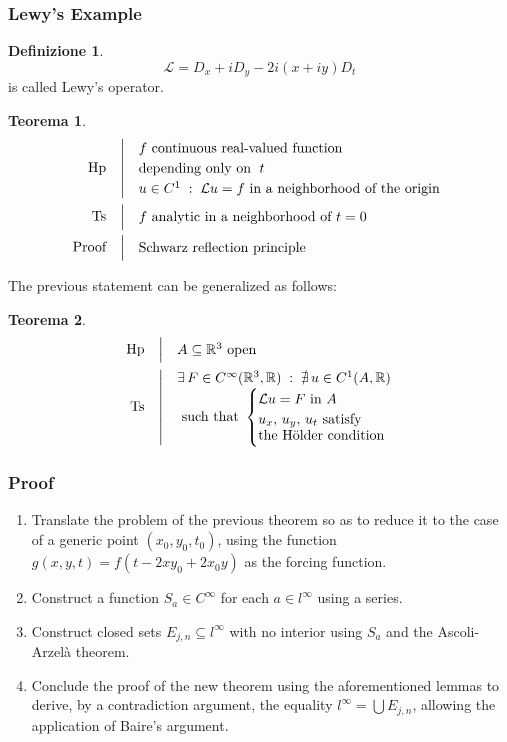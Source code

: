 \documentclass[serif,notheorems]{beamer}
\makeatletter
\newenvironment{ipotesi}%
{\quad\left|\quad\def\arraystretch{1.2}\begin{array}{@{}l@{}}}%
{\end{array}\right.}
\newcommand{\hpth}[2]
{
\begin{align*}
\quad
\text{Hp}
&\begin{ipotesi}
#1
\end{ipotesi}\\
\text{Ts}
&\begin{ipotesi}
#2
\end{ipotesi}
\end{align*}
}
\newcommand{\hpthdim}[3]
{
\begin{align*}
\quad
\text{Hp}
&\begin{ipotesi} 
#1
\end{ipotesi}\\
\text{Ts}
&\begin{ipotesi}
#2
\end{ipotesi}\\
\text{Proof}
&\begin{ipotesi}
#3
\end{ipotesi}
\end{align*}
}
\theoremstyle{definition} %
\newtheorem{theorem}{Teorema}[section] %
\newtheorem{definition}{Definizione}[section] %
\theoremstyle{remark}
\makeatother
\begin{document}
\begin{frame}
\frametitle{Lewy's Example}
\begin{definition}
$$\mathcal{L}=D_x+iD_y-2i(x+iy)D_t$$
is called Lewy's operator.
\end{definition}
\end{frame}

\begin{frame}
\begin{theorem}
\hpthdim{
f \text{ continuous real-valued function}\\ 
\text{depending only on } \; t\\
u\in C^1\;:\;\mathcal{L}u=f \text{ in a neighborhood of the origin }
}
{f \text{ analytic in a neighborhood of } t=0}{
\text{Schwarz reflection principle}
}
\end{theorem}
\end{frame}

\begin{frame}
The previous statement can be generalized as follows:
\begin{theorem}
\hpth{
A \subseteq \mathbb{R}^3 \text{ open }\\
}
{
\exists \, F \in C^{\infty}(\mathbb{R}^3,\mathbb{R}) \; : \; \nexists \, u \in C^1(A,\mathbb{R}) \\ \text{ such that }
\begin{cases}
\mathcal{L}u=F \text{ in } A\\
\vspace{-1mm}
u_x,\,u_y,\,u_t \text{ satisfy} \\
\text {the Hölder condition }
\end{cases}
}
\end{theorem}
\end{frame}

\begin{frame}
\frametitle{Proof}
\begin{enumerate}
\item
Translate the problem of the previous theorem so as to reduce it to the case of a generic point $(x_0,y_0,t_0)$, using the function $g(x,y,t)=f(t-2xy_0+2x_0y)$ as the forcing function.
\item
Construct a function $S_a \in C^\infty$ for each $a \in l^\infty$ using a series.
\item
Construct closed sets $E_{j,n} \subseteq l^\infty$ with no interior using $S_a$ and the Ascoli-Arzelà theorem.
\item
Conclude the proof of the new theorem using the aforementioned lemmas to derive, by a contradiction argument, the equality $l^\infty = \bigcup E_{j,n}$, allowing the application of Baire's argument.
\end{enumerate}
\end{frame}
\end{document}
